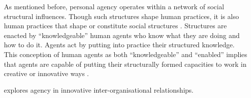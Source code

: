 As mentioned before, personal agency operates within a network of social structural influences. Though such structures shape human practices, it is also human practices that shape or constitute social structures \citep{sewell1992theory}. Structures are enacted by \enquote{knowledgeable} human agents who know what they are doing and how to do it. Agents act by putting into practice their structured knowledge. This conception of human agents as both \enquote{knowledgeable} and \enquote{enabled} implies that agents are capable of putting their structurally formed capacities to work in creative or innovative ways \citep{giddens1984constitution}. \medskip

\citet{davis2010agency} explores agency in innovative inter-organisational relationships.











